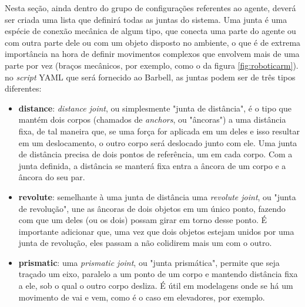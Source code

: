 \documentclass[cic,tc]{iiufrgs}
\begin{document}
Nesta seção, ainda dentro do grupo de configurações referentes ao agente, deverá ser criada uma lista que definirá todas as juntas do sistema. Uma junta
é uma espécie de conexão mecânica de algum tipo, que conecta uma parte do agente ou com outra parte dele ou com um objeto disposto no ambiente, o que é
de extrema importância na hora de definir movimentos complexos que envolvem mais de uma parte por vez (braços mecânicos, por exemplo, como o da figura \ref{fig:roboticarm}).
no \textit{script} YAML que será fornecido ao Barbell, as juntas podem ser de três tipos diferentes:
\begin{itemize}
  \item \textbf{distance}: \textit{distance joint}, ou simplesmente "junta de distância", é o tipo que mantém dois corpos (chamados de \textit{anchors}, ou "âncoras") a uma distância fixa, de tal maneira que, se uma força for aplicada em um deles e isso resultar em um deslocamento,
  o outro corpo será deslocado junto com ele. Uma junta de distância precisa de dois pontos de referência, um em cada corpo.
  Com a junta definida, a distância se manterá fixa entra a âncora de um corpo e a âncora do seu par.
  \item \textbf{revolute}: semelhante à uma junta de distância uma \textit{revolute joint}, ou "junta de revolução", une as âncoras de dois objetos em um
  único ponto, fazendo com que um deles (ou os dois) possam girar em torno desse ponto. É importante adicionar que, uma vez que dois objetos estejam
  unidos por uma junta de revolução, eles passam a não colidirem mais um com o outro.
  \item \textbf{prismatic}: uma \textit{prismatic joint}, ou "junta prismática", permite que seja traçado um eixo, paralelo a um ponto de um corpo e
  mantendo distância fixa a ele, sob o qual o outro corpo desliza. É útil em modelagens onde se há um movimento de vai e vem, como é o caso em elevadores,
  por exemplo.
\end{itemize}
\end{document}
